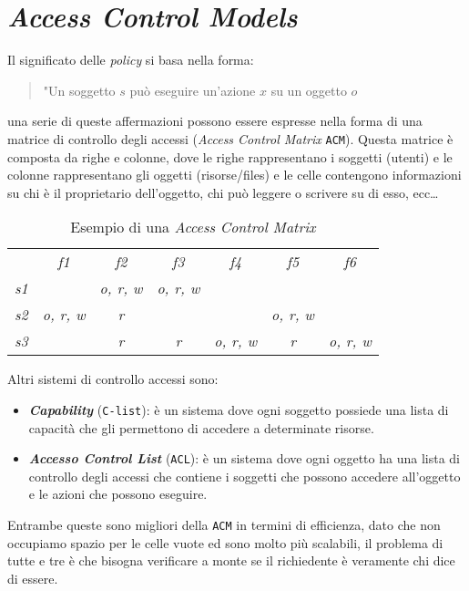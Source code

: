 \section{\textit{Access Control Models}}
    Il significato delle \textit{policy} si basa nella forma:
    \begin{quote}
        "Un soggetto $s$ può eseguire un'azione $x$ su un oggetto $o$
    \end{quote}
    una serie di queste affermazioni possono essere espresse nella forma di una matrice di controllo degli accessi (\textit{Access Control Matrix} \texttt{ACM}). Questa matrice è composta da righe e colonne, dove le righe rappresentano i soggetti (utenti) e le colonne rappresentano gli oggetti (risorse/files) e le celle contengono informazioni su chi è il proprietario dell'oggetto, chi può leggere o scrivere su di esso, ecc\dots
    \begin{table}[H]
        \centering
        \begin{tabular}{c|c|c|c|c|c|c|}
            \multicolumn{1}{c}{} & \multicolumn{1}{c}{\textit{f1}} & \multicolumn{1}{c}{\textit{f2}} & \multicolumn{1}{c}{\textit{f3}} & \multicolumn{1}{c}{\textit{f4}} & \multicolumn{1}{c}{\textit{f5}} & \multicolumn{1}{c}{\textit{f6}} \\
            \cline{2-7}
            \textit{s1} & &\textit{o, r, w} & \textit{o, r, w} &&& \\
            \cline{2-7}
            \textit{s2} & \textit{o, r, w} & \textit{r} & & & \textit{o, r, w} & \\
            \cline{2-7}
            \textit{s3} & & \textit{r} & \textit{r} & \textit{o, r, w} & \textit{r} & \textit{o, r, w} \\
            \cline{2-7}
        \end{tabular}
        \caption{Esempio di una \textit{Access Control Matrix}}
    \end{table}
    Altri sistemi di controllo accessi sono:
    \begin{itemize}
        \item \textit\textbf{Capability} (\texttt{C-list}): è un sistema dove ogni soggetto possiede una lista di capacità che gli permettono di accedere a determinate risorse. 
        \item \textit\textbf{Accesso Control List} (\texttt{ACL}): è un sistema dove ogni oggetto ha una lista di controllo degli accessi che contiene i soggetti che possono accedere all'oggetto e le azioni che possono eseguire.
    \end{itemize}
    Entrambe queste sono migliori della \texttt{ACM} in termini di efficienza, dato che non occupiamo spazio per le celle vuote ed sono molto più scalabili, il problema di tutte e tre è che bisogna verificare a monte se il richiedente è veramente chi dice di essere.

